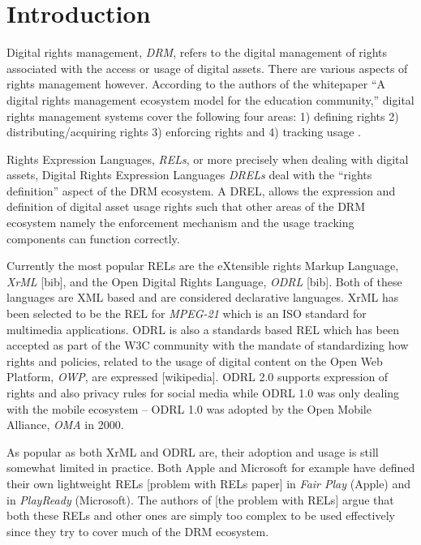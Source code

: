 \chapter{Introduction}
Digital rights management, \emph{DRM}, refers to the digital management of rights associated with the access or usage of digital assets. There are various aspects of rights management however. According to the authors of the whitepaper ``A digital rights management ecosystem model for the education community,'' digital rights management systems cover the following four areas: 1) defining rights 2) distributing/acquiring rights 3) enforcing rights and 4) tracking usage \cite{collier}. 

Rights Expression Languages, \emph{RELs}, or more precisely when dealing with digital assets, Digital Rights Expression Languages \emph{DRELs} deal with the ``rights definition'' aspect of the DRM ecosystem. A DREL, allows the expression and definition of digital asset usage rights such that other areas of the DRM ecosystem namely the enforcement mechanism and the usage tracking components can function correctly.

Currently the most popular RELs are the eXtensible rights Markup Language, \emph{XrML} [bib], and the Open Digital Rights Language, \emph{ODRL} [bib]. Both of these languages are XML based and are considered declarative languages. XrML has been selected to be the REL for \emph{MPEG-21} which is an ISO standard for multimedia applications. ODRL is also a standards based REL which has been accepted as part of the W3C community with the mandate of standardizing how rights and policies, related to the usage of digital content on the Open Web Platform, \emph{OWP}, are expressed [wikipedia]. ODRL 2.0 supports expression of rights and also privacy rules for social media while ODRL 1.0 was only dealing with the mobile ecosystem -- ODRL 1.0 was adopted by the Open Mobile Alliance, \emph{OMA} in 2000.

As popular as both XrML and ODRL are, their adoption and usage is still somewhat limited in practice. Both Apple and Microsoft for example have defined their own lightweight RELs [problem with RELs paper] in \emph{Fair Play} (Apple) and in \emph{PlayReady} (Microsoft). The authors of [the problem with RELs] argue that both these RELs and other ones are simply too complex to be used effectively since they try to cover much of the DRM ecosystem. 

